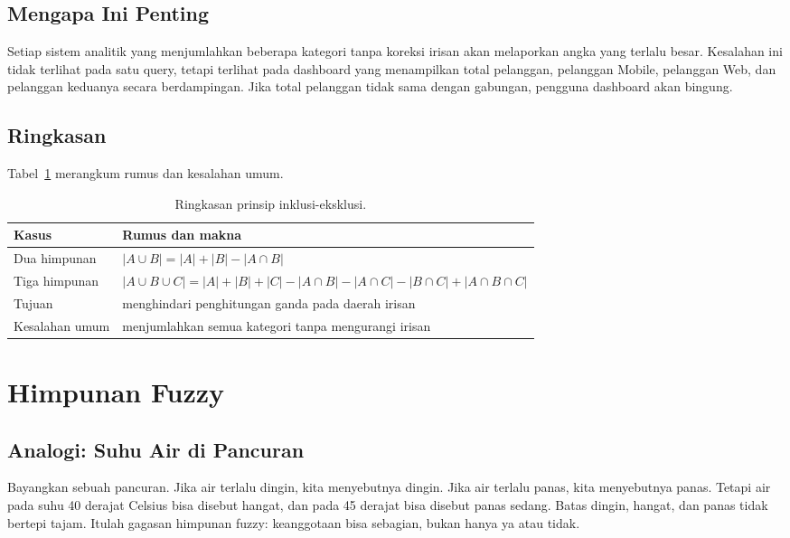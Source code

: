 \documentclass[11pt,a4paper]{article}
\begin{document}
\subsection{Mengapa Ini Penting}

Setiap sistem analitik yang menjumlahkan beberapa kategori tanpa koreksi irisan akan melaporkan angka yang terlalu besar. Kesalahan ini tidak terlihat pada satu query, tetapi terlihat pada dashboard yang menampilkan total pelanggan, pelanggan Mobile, pelanggan Web, dan pelanggan keduanya secara berdampingan. Jika total pelanggan tidak sama dengan gabungan, pengguna dashboard akan bingung.

\subsection{Ringkasan}

Tabel~\ref{tab:inklusi} merangkum rumus dan kesalahan umum.

\begin{table}[H]
	\centering
	\caption{Ringkasan prinsip inklusi-eksklusi.}
	\label{tab:inklusi}
	\small
	\begin{tabularx}{\textwidth}{l X}
		\toprule
		Kasus          & Rumus dan makna                                                                    \\
		\midrule
		Dua himpunan   & $|A \cup B|=|A|+|B|-|A \cap B|$                                                    \\
		Tiga himpunan  & $|A \cup B \cup C|=|A|+|B|+|C|-|A \cap B|-|A \cap C|-|B \cap C|+|A \cap B \cap C|$ \\
		Tujuan         & menghindari penghitungan ganda pada daerah irisan                                  \\
		Kesalahan umum & menjumlahkan semua kategori tanpa mengurangi irisan                                \\
		\bottomrule
	\end{tabularx}
\end{table}

\section{Himpunan Fuzzy}

\subsection{Analogi: Suhu Air di Pancuran}

Bayangkan sebuah pancuran. Jika air terlalu dingin, kita menyebutnya dingin. Jika air terlalu panas, kita menyebutnya panas. Tetapi air pada suhu 40 derajat Celsius bisa disebut hangat, dan pada 45 derajat bisa disebut panas sedang. Batas dingin, hangat, dan panas tidak bertepi tajam. Itulah gagasan himpunan fuzzy: keanggotaan bisa sebagian, bukan hanya ya atau tidak.
\end{document}
